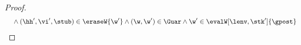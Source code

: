 \begin{proof}
\[\begin{array}{@{}l}
    \quad {} \land (\hh',\vi', \stub) \in \eraseW{\w'}
    \land (\w, \w') \in \Guar 
    \land \w' \in \evalW[\lenv, \stk']{\gpost}
\end{array}
\]

\end{proof}
